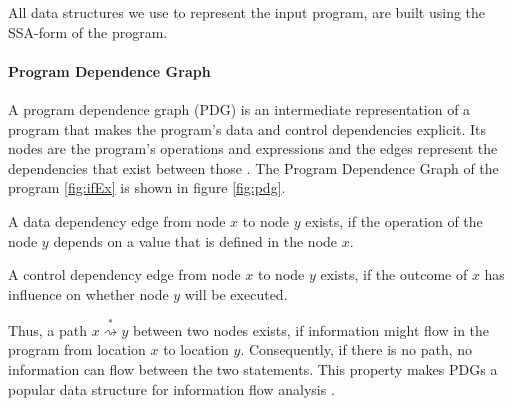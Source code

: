All data structures we use to represent the input program, are built using the SSA-form of the program.

\paragraph{Program Dependence Graph}
A program dependence graph (PDG) is an intermediate representation of a program that makes the program's data and control dependencies explicit. Its nodes are the program's operations and expressions and the edges represent the dependencies that exist between those \cite{ferrante84}. The Program Dependence Graph of the program \ref{fig:ifEx} is shown in figure \ref{fig:pdg}.

A data dependency edge from node $x$ to node $y$ exists, if the operation of the node $y$ depends on a value that is defined in the node $x$.

A control dependency edge from node $x$ to node $y$ exists, if the outcome of $x$ has influence on whether node $y$ will be executed.

Thus, a path $x \stackrel{*}{\rightsquigarrow } y$ between two nodes exists, if information might flow in the program from location $x$ to location $y$. Consequently, if there is no path, no information can flow between the two statements. This property makes PDGs a popular data structure for information flow analysis \cite{horwitz88,giffhorn12}.

